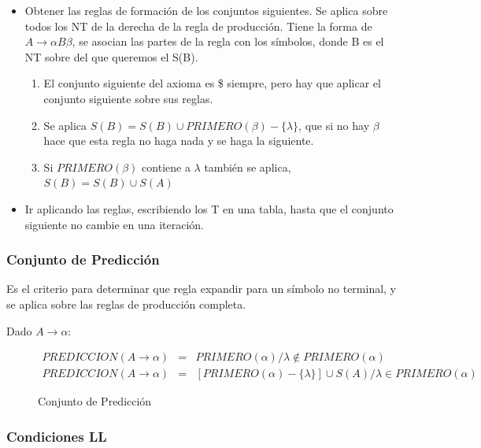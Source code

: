 \documentclass[12pt, twoside, openright]{report} %
\begin{document}
\begin{itemize}

\item
  Obtener las reglas de formación de los conjuntos siguientes. Se aplica
  sobre todos los NT de la derecha de la regla de producción. Tiene la
  forma de \(A \rightarrow \alpha B \beta\), se asocian las partes de la
  regla con los símbolos, donde B es el NT sobre del que queremos el
  S(B).

\begin{enumerate}
\def\labelenumi{\arabic{enumi}.}
\item
  El conjunto siguiente del axioma es \$ siempre, pero hay que aplicar
  el conjunto siguiente sobre sus reglas.
\item
  Se aplica \(S(B)=S(B)\cup PRIMERO(\beta)-\{\lambda\}\), que si no hay
  \(\beta\) hace que esta regla no haga nada y se haga la siguiente.
\item
  Si \(PRIMERO(\beta)\) contiene a \(\lambda\) también se aplica,
  \(S(B)=S(B)\cup S(A)\)
\end{enumerate}


\item
  Ir aplicando las reglas, escribiendo los T en una tabla, hasta que el
  conjunto siguiente no cambie en una iteración.
\end{itemize}

\subsubsection{Conjunto de Predicción}

Es el criterio para determinar que regla expandir para un símbolo no
terminal, y se aplica sobre las reglas de producción completa.

Dado \(A \rightarrow \alpha\):

\begin{figure}[H]
 \begin{eqnarray*}
    PREDICCION(A \rightarrow \alpha) &=& PRIMERO(\alpha) / \lambda \notin PRIMERO(\alpha) \\
    PREDICCION(A \rightarrow \alpha) &=& [PRIMERO(\alpha)-\{\lambda\}] \cup S(A) / \lambda \in PRIMERO(\alpha)
 \end{eqnarray*}

  \captionsetup{justification=centering}
  \caption{Conjunto de Predicción}
\end{figure}

\pagebreak
\subsubsection{Condiciones LL}
\end{document}
